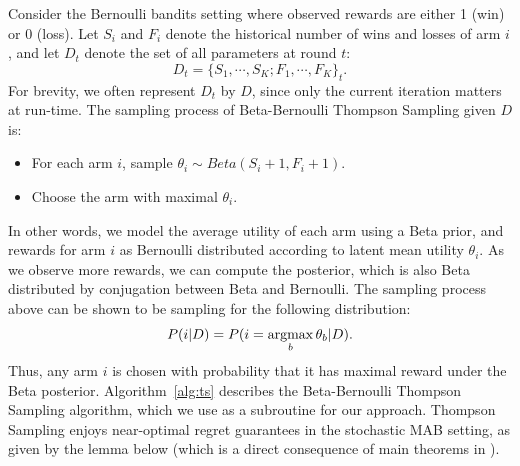 Consider the Bernoulli bandits setting where observed rewards are either 1 (win) or 0 (loss).  Let $S_i$ and $F_i$ denote the historical number of wins and losses of arm $i$, and let $D_t$ denote the set of all parameters at round $t$:
$$D_t= \{ S_1, \cdots, S_K; F_1, \cdots, F_K\}_t.$$
For brevity, we often represent $D_t$ by $D$, since only the current iteration matters at run-time. The sampling process of Beta-Bernoulli Thompson Sampling given $D$ is:
\begin{itemize}
\vspace{-0.1in}
\item For each arm $i$, sample $\theta_i \sim Beta(S_i+1,F_i+1)$.
\vspace{-0.1in}
\item Choose the arm with maximal $\theta_i$.
\end{itemize}
In other words, we model the average utility of each arm using a Beta prior, and rewards for arm $i$ as Bernoulli distributed according to latent mean utility $\theta_i$.  As we observe more rewards, we can compute the posterior, which is also Beta distributed by conjugation between Beta and Bernoulli.  The sampling process above can be shown to be sampling for the following distribution:
\begin{eqnarray}
P(i|D) = P(i =\argmax_b \theta_b|D).
\label{eqn:ts}
\end{eqnarray}
Thus, any arm $i$ is chosen with probability that it has  maximal reward under the Beta posterior. Algorithm~\ref{alg:ts} describes the Beta-Bernoulli Thompson Sampling algorithm, which we use as a subroutine for our approach.
Thompson Sampling enjoys near-optimal regret guarantees in the stochastic MAB setting, as given by the lemma below (which is a direct consequence of main theorems in \citet{agrawal2012,kaufmann2012}).


 
